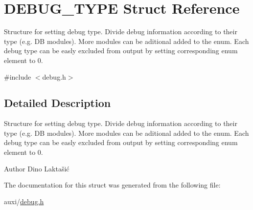 \hypertarget{structDEBUG__TYPE}{}\section{D\+E\+B\+U\+G\+\_\+\+T\+Y\+PE Struct Reference}
\label{structDEBUG__TYPE}


Structure for setting debug type. Divide debug information according to their type (e.\+g. DB modules). More modules can be aditional added to the enum. Each debug type can be easly excluded from output by setting corresponding enum element to 0.  




{\ttfamily \#include $<$debug.\+h$>$}



\subsection{Detailed Description}
Structure for setting debug type. Divide debug information according to their type (e.\+g. DB modules). More modules can be aditional added to the enum. Each debug type can be easly excluded from output by setting corresponding enum element to 0. 

\begin{DoxyAuthor}{Author}
Dino Laktašić 
\end{DoxyAuthor}


The documentation for this struct was generated from the following file\+:\begin{DoxyCompactItemize}
\item 
auxi/\hyperlink{debug_8h}{debug.\+h}\end{DoxyCompactItemize}
